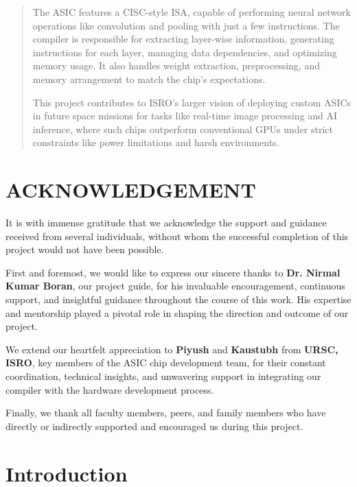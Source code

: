 \documentclass[12pt]{report}
\begin{document}
\begin{spacing}{1.01}
\begin{abstract}
The ASIC features a CISC-style ISA, capable of performing neural network operations like convolution and pooling with just a few instructions. The compiler is responsible for extracting layer-wise information, generating instructions for each layer, managing data dependencies, and optimizing memory usage. It also handles weight extraction, preprocessing, and memory arrangement to match the chip’s expectations.

This project contributes to ISRO’s larger vision of deploying custom ASICs in future space missions for tasks like real-time image processing and AI inference, where such chips outperform conventional GPUs under strict constraints like power limitations and harsh environments.

\end{abstract}
\chapter*{\rm \large \bf ACKNOWLEDGEMENT}
It is with immense gratitude that we acknowledge the support and guidance received from several individuals, without whom the successful completion of this project would not have been possible.

First and foremost, we would like to express our sincere thanks to \textbf{Dr. Nirmal Kumar Boran}, our project guide, for his invaluable encouragement, continuous support, and insightful guidance throughout the course of this work. His expertise and mentorship played a pivotal role in shaping the direction and outcome of our project.

We extend our heartfelt appreciation to \textbf{Piyush} and \textbf{Kaustubh} from \textbf{URSC, ISRO}, key members of the ASIC chip development team, for their constant coordination, technical insights, and unwavering support in integrating our compiler with the hardware development process.

Finally, we thank all faculty members, peers, and family members who have directly or indirectly supported and encouraged us during this project.
\vspace{4.0mm}
\tableofcontents
{}
\end{spacing}
\listoffigures
\vspace{-2 em}
\printglossary[nonumberlist]



\chapter{Introduction}
\end{document}
